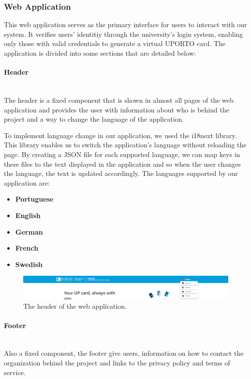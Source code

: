 \documentclass[12pt]{article}
\begin{document}
\subsubsection{Web Application}

This web application serves as the primary interface for users to
interact with our system. It verifies users' identitiy through the
university's login system, enabling only those with valid credentials to generate a virtual UPORTO card.
The application is divided into some sections that are detailed below:

\paragraph{Header}\mbox{}\\
The header is a fixed component that is shown in almost all pages of the web application
and provides the user with information about who is behind the project and
a way to change the language of the application.

To implement language change in our application, we used the i18next library. This
library enables us to switch the application's language without reloading the page.
By creating a JSON file for each supported language, we can map keys in these files to the text
displayed in the application and so when the user changes the language, the text is updated accordingly.
The languages supported by our application are:

\begin{itemize}
	\item \textbf{Portuguese}
	\item \textbf{English}
	\item \textbf{German}
	\item \textbf{French}
	\item \textbf{Swedish}
\end{itemize}


\begin{figure}[H]
	\centering
	\includegraphics[width=\textwidth]{header.png}
	\caption{The header of the web application.}
\end{figure}

\paragraph{Footer}\mbox{}\\
Also a fixed component, the footer give users, information on how to contact
the organization behind the project and links to the privacy policy and terms of service.
\end{document}
